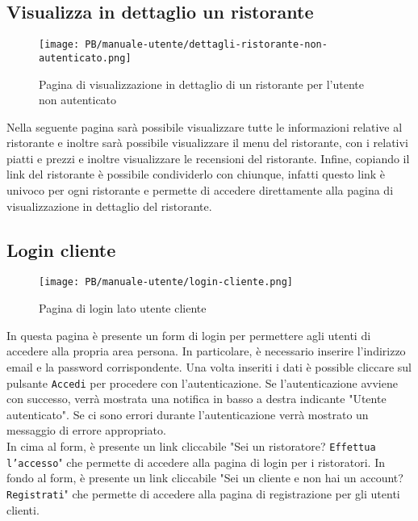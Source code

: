\subsection{Visualizza in dettaglio un ristorante}

\begin{figure}[htbp]
    \centering
	\texttt{[image: PB/manuale-utente/dettagli-ristorante-non-autenticato.png]}
    \caption{Pagina di visualizzazione in dettaglio di un ristorante per l'utente non autenticato}
\end{figure}

Nella seguente pagina sarà possibile visualizzare tutte le informazioni relative 
al ristorante e inoltre sarà possibile visualizzare il menu del ristorante, con 
i relativi piatti e prezzi e inoltre visualizzare le recensioni del ristorante.
Infine, copiando il link del ristorante è possibile condividerlo con chiunque,
infatti questo link è univoco per ogni ristorante e permette di accedere 
direttamente alla pagina di visualizzazione in dettaglio del ristorante.

\subsection{Login cliente}

\begin{figure}[htbp]
    \centering
	\texttt{[image: PB/manuale-utente/login-cliente.png]}
    \caption{Pagina di login lato utente cliente}
\end{figure}

In questa pagina è presente un form di login per permettere agli utenti di
accedere alla propria area persona. In particolare, è necessario inserire
l'indirizzo email e la password corrispondente. Una volta inseriti i dati è
possible cliccare sul pulsante \texttt{Accedi} per procedere con 
l'autenticazione. Se l'autenticazione avviene con successo, verrà mostrata una
notifica in basso a destra indicante "Utente autenticato". Se ci sono errori
durante l'autenticazione verrà mostrato un messaggio di errore appropriato.\\
In cima al form, è presente un link cliccabile "Sei un ristoratore?
\texttt{Effettua l'accesso}" che permette di accedere alla pagina di login per
i ristoratori. In fondo al form, è presente un link cliccabile "Sei un cliente e 
non hai un account? \texttt{Registrati}" che permette di accedere alla pagina di 
registrazione per gli utenti clienti.

